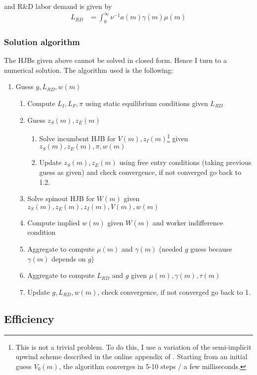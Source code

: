 \documentclass[12pt,english]{article}
\theoremstyle{remark}
\begin{document}
and R\&D labor demand is given by 
\begin{align*}
	L_{RD} &= \int_0^{\infty} \nu^{-1} a(m) \gamma(m) \mu(m)
\end{align*}

\subsubsection{Solution algorithm}\label{solution_algorithm}

The HJBs given above cannot be solved in closed form. Hence I turn to a numerical solution. The algorithm used is the following:

\begin{enumerate}
	\item Guess $g, L_{RD}, w(m)$
	\begin{enumerate}
		\item Compute $L_I,L_F,\pi$ using static equilibrium conditions given $L_{RD}$ 
		\item Guess $z_S(m),z_E(m)$ 
		\begin{enumerate}
			\item Solve incumbent HJB for $V(m),z_I(m)$\footnote{This is not a trivial problem. To do this, I use a variation of the semi-implicit upwind scheme described in the online appendix of \cite{achdou_income_2017}. Starting from an initial guess $V_0(m)$, the algorithm converges in 5-10 steps / a few milliseconds.} given $z_S(m),z_E(m),\pi,w(m)$
			\item Update $z_S(m),z_E(m)$ using free entry conditions (taking previous guess as given) and check convergence, if not converged go back to 1.2.
		\end{enumerate}
		\item Solve spinout HJB for $W(m)$ given $z_S(m),z_E(m),z_I(m),V(m),w(m)$
		\item Compute implied $w(m)$ given $W(m)$ and worker indifference condition
		\item Aggregate to compute $\mu(m)$ and $\gamma(m)$ (needed $g$ guess because $\gamma(m)$ depends on $g$)
		\item Aggregate to compute $L_{RD}$ and $g$ given $\mu(m),\gamma(m),\tau(m)$
		\item Update $g,L_{RD},w(m)$, check convergence, if not converged go back to 1.
	\end{enumerate}
\end{enumerate}

\subsection{Efficiency}
\end{document}
